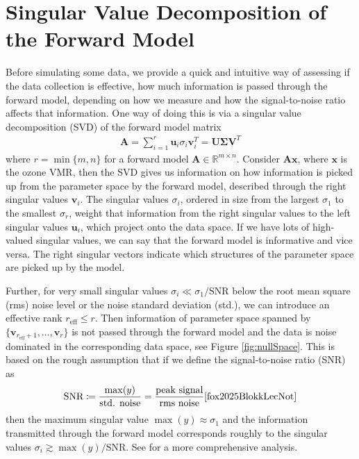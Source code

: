 \section{Singular Value Decomposition of the Forward Model}
Before simulating some data, we provide a quick and intuitive way of assessing if the data collection is effective, how much information is passed through the forward model, depending on how we measure and how the signal-to-noise ratio affects that information.
One way of doing this is via a singular value decomposition (SVD) of the forward model matrix
\begin{align}
	\bm{A} = \sum_{i =1}^{r} \bm{u}_i  \sigma_i \bm{v}^T_i = \bm{U} \bm{\Sigma} \bm{V}^T
\end{align}
where $r = \min\{m,n\}$ for a forward model $\bm{A} \in \mathbb{R}^{m \times n}$.
Consider $\bm{A}\bm{x}$, where $\bm{x}$ is the ozone VMR, then the SVD gives us information on how information is picked up from the parameter space by the forward model, described through the right singular values $\bm{v}_i$.
The singular values $\sigma_i $, ordered in size from the largest $\sigma_1$ to the smallest $\sigma_{r}$, weight that information from the right singular values to the left singular values $\bm{u}_i$, which project onto the data space.
If we have lots of high-valued singular values, we can say that the forward model is informative and vice versa.
The right singular vectors indicate which structures of the parameter space are picked up by the model.

Further, for very small singular values $\sigma_i \ll \sigma_1/\text{SNR}$ below the root mean square (rms) noise level or the noise standard deviation (std.), we can introduce an effective rank $r_{\text{eff}} \leq r$.
Then information of parameter space spanned by $ \{\bm{v}_{r_{\text{eff}} +1}, \dots ,\bm{v}_r \}$ is not passed through the forward model and the data is noise dominated in the corresponding data space, see Figure \ref{fig:nullSpace}.
This is based on the rough assumption that if we define the signal-to-noise ratio (SNR) as
\begin{align}
	\text{SNR} \coloneqq \frac{\max(y)}{\text{std. noise}} = \frac{\text{peak signal}}{\text{rms noise}} \text{\cite{fox2025BlokkLecNot}}
\end{align}
then the maximum singular value $\max(y) \approx \sigma_1$ and the information transmitted through the forward model corresponds roughly to the singular values $\sigma_i \gtrsim \max(y)/ \text{SNR}$.
See \cite{tan2016LecNot} for a more comprehensive analysis.

